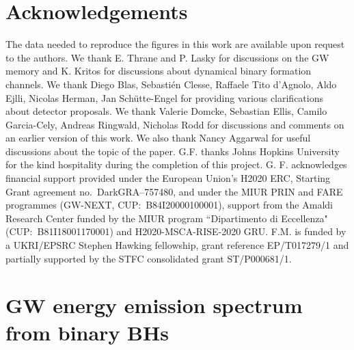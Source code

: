 \documentclass[11pt,a4paper]{article}
\begin{document}
\section*{Acknowledgements} 
The data needed to reproduce the figures in this work are available upon request to the authors.
We thank E. Thrane and P. Lasky for discussions on the GW memory and K. Kritos for discussions about dynamical binary formation channels. 
We thank Diego Blas, Sebasti\'en Clesse, Raffaele Tito d'Agnolo, Aldo Ejlli,  Nicolas Herman, Jan Sch\"utte-Engel for providing various clarifications about detector proposals. 
We thank Valerie Domcke, Sebastian Ellis, Camilo Garcia-Cely, Andreas Ringwald, Nicholas Rodd for discussions and comments on an earlier version of this work. 
We also thank Nancy Aggarwal for useful discussions about the topic of the paper.
G.F. thanks Johns Hopkins University for the kind hospitality during the completion of this project.
G. F. acknowledges financial support provided under the European Union's H2020 ERC, Starting Grant agreement no.~DarkGRA--757480, and under the MIUR PRIN and FARE programmes (GW-NEXT, CUP:~B84I20000100001), support from the Amaldi Research Center funded by the MIUR program ``Dipartimento di Eccellenza" (CUP:~B81I18001170001) and H2020-MSCA-RISE-2020 GRU. F.M. is funded
by a UKRI/EPSRC Stephen Hawking fellowship, grant
reference EP/T017279/1 and partially supported by the
STFC consolidated grant ST/P000681/1.



\appendix 

\section{GW energy emission spectrum from binary BHs}\label{app_GW_energy}
\end{document}
